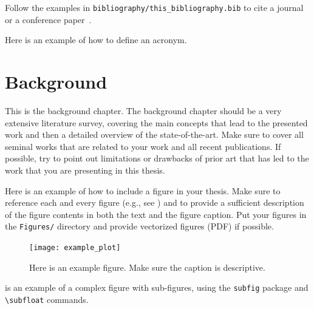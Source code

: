 \documentclass[a4paper,12pt,twoside,openany]{book}
\begin{document}
\color{cyan}
    Follow the examples in \texttt{bibliography/this\_bibliography.bib} to cite a journal~\cite{nameYEARtitleJOURNAL} or a conference paper~\cite{nameYEARtitleCONFERENCE}.
    
    Here is an \gls{example} of how to define an acronym.
\color{black}


\chapter{Background}
\label{sec_background}
\color{teal}
    This is the background chapter. The background chapter should be a very extensive literature survey, covering the main concepts that lead to the presented work and then a detailed overview of the state-of-the-art. Make sure to cover all seminal works that are related to your work and all recent publications. If possible, try to point out limitations or drawbacks of prior art that has led to the work that you are presenting in this thesis.

\color{cyan}
    Here is an example of how to include a figure in your thesis. Make sure to reference each and every figure (e.g., see ) and to provide a sufficient description of the figure contents in both the text and the figure caption. Put your figures in the \texttt{Figures/} directory and provide vectorized figures (PDF) if possible. 

    \begin{figure}[h]
        \centering
        \texttt{[image: example\_plot]}
        \caption{Here is an example figure. Make sure the caption is descriptive.}
        \label{fig:myfigure}
    \end{figure}

     is an example of a complex figure with sub-figures, using the \texttt{subfig} package and \texttt{\textbackslash subfloat} commands.
\end{document}
